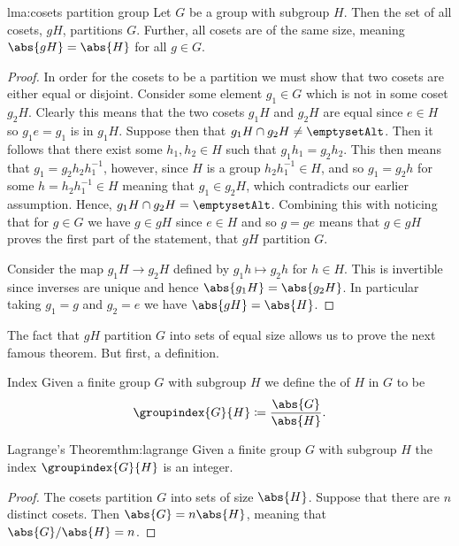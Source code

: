 \begin{lma}{}{lma:cosets partition group}
    Let \(G\) be a group with subgroup \(H\).
    Then the set of all cosets, \(gH\), partitions \(G\).
    Further, all cosets are of the same size, meaning \(\abs{gH} = \abs{H}\) for all \(g \in G\).
    
    \begin{proof}
        In order for the cosets to be a partition we must show that two cosets are either equal or disjoint.
        Consider some element \(g_1 \in G\) which is not in some coset \(g_2H\).
        Clearly this means that the two cosets \(g_1H\) and \(g_2H\) are equal since \(e \in H\) so \(g_1e = g_1\) is in \(g_1H\).
        Suppose then that \(g_1H \intersection g_2H \ne \emptyset\).
        Then it follows that there exist some \(h_1, h_2 \in H\) such that \(g_1h_1 = g_2h_2\).
        This then means that \(g_1 = g_2h_2h_1^{-1}\), however, since \(H\) is a group \(h_2h_1^{-1} \in H\), and so \(g_1 = g_2h\) for some \(h = h_2h_1^{-1} \in H\) meaning that \(g_1 \in g_2H\), which contradicts our earlier assumption.
        Hence, \(g_1H \intersection g_2H = \emptyset\).
        Combining this with noticing that for \(g \in G\) we have \(g \in gH\) since \(e \in H\) and so \(g = ge\) means that \(g \in gH\) proves the first part of the statement, that \(gH\) partition \(G\).
        
        Consider the map \(g_1H \to g_2H\) defined by \(g_1h \mapsto g_2h\) for \(h \in H\).
        This is invertible since inverses are unique and hence \(\abs{g_1H} = \abs{g_2H}\).
        In particular taking \(g_1 = g\) and \(g_2 = e\) we have \(\abs{gH} = \abs{H}\).
    \end{proof}
\end{lma}

The fact that \(gH\) partition \(G\) into sets of equal size allows us to prove the next famous theorem.
But first, a definition.

\begin{dfn}{Index}{}
    Given a finite group \(G\) with subgroup \(H\) we define the  of \(H\) in \(G\) to be
    \begin{equation}
        \groupindex{G}{H} \coloneqq \frac{\abs{G}}{\abs{H}}.
    \end{equation}
\end{dfn}

\begin{thm}{Lagrange's Theorem}{thm:lagrange}
    Given a finite group \(G\) with subgroup \(H\) the index \(\groupindex{G}{H}\) is an integer.
    
    \begin{proof}
        The cosets partition \(G\) into sets of size \(\abs{H}\).
        Suppose that there are \(n\) distinct cosets.
        Then \(\abs{G} = n\abs{H}\), meaning that \(\abs{G}/\abs{H} = n\).
    \end{proof}
\end{thm}

